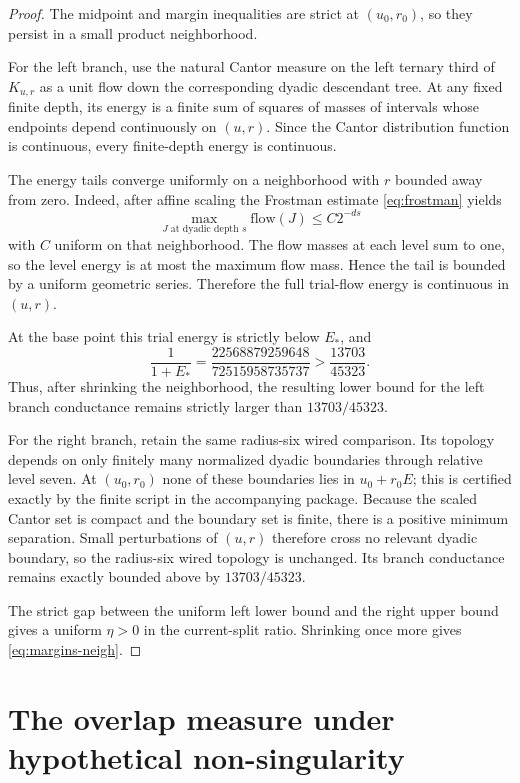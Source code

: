 \documentclass[11pt]{article}
\theoremstyle{remark}
\begin{document}
\begin{proof}
The midpoint and margin inequalities are strict at $(u_0,r_0)$, so they persist in a small product neighborhood.

For the left branch, use the natural Cantor measure on the left ternary third of $K_{u,r}$ as a unit flow down the corresponding dyadic descendant tree.  At any fixed finite depth, its energy is a finite sum of squares of masses of intervals whose endpoints depend continuously on $(u,r)$.  Since the Cantor distribution function is continuous, every finite-depth energy is continuous.

The energy tails converge uniformly on a neighborhood with $r$ bounded away from zero.  Indeed, after affine scaling the Frostman estimate \eqref{eq:frostman} yields
\[
 \max_{J\text{ at dyadic depth }s}\text{flow}(J)\le C2^{-ds}
\]
with $C$ uniform on that neighborhood.  The flow masses at each level sum to one, so the level energy is at most the maximum flow mass.  Hence the tail is bounded by a uniform geometric series.  Therefore the full trial-flow energy is continuous in $(u,r)$.

At the base point this trial energy is strictly below $E_*$, and
\[
 \frac1{1+E_*}=\frac{22568879259648}{72515958735737}
 >\frac{13703}{45323}.
\]
Thus, after shrinking the neighborhood, the resulting lower bound for the left branch conductance remains strictly larger than $13703/45323$.

For the right branch, retain the same radius-six wired comparison.  Its topology depends on only finitely many normalized dyadic boundaries through relative level seven.  At $(u_0,r_0)$ none of these boundaries lies in $u_0+r_0E$; this is certified exactly by the finite script in the accompanying package.  Because the scaled Cantor set is compact and the boundary set is finite, there is a positive minimum separation.  Small perturbations of $(u,r)$ therefore cross no relevant dyadic boundary, so the radius-six wired topology is unchanged.  Its branch conductance remains exactly bounded above by $13703/45323$.

The strict gap between the uniform left lower bound and the right upper bound gives a uniform $\eta>0$ in the current-split ratio.  Shrinking once more gives \eqref{eq:margins-neigh}.
\end{proof}

\section{The overlap measure under hypothetical non-singularity}
\end{document}
